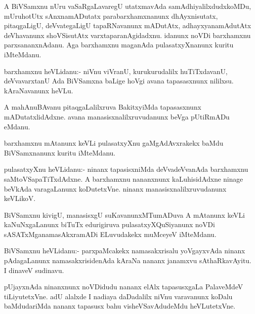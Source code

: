 \documentclass{article}
\begin{document}
\begin{mn}
A BiVSamxnu nUru vaSaRgaLavaregU utatxmavAda samAdhiyalilxdudxkoMDu,
mUruhotUtx sAnxnamADutatx parabarxhamxnanunx dhAyxnisutatx,
pitaqgaLigU, deVvategaLigU tapaRNavanunx mADutAtx, adhayxyanamAdutAtx
deVhavanunx shoVSisutAtx varxtaparanAgidadxnu. idanunx noVDi
barxhamxnu parxsananxnAdanu. Aga barxhamxnu maganAda pulasatxyXnanunx
kuritu iMteMdanu.
\end{mn}

\begin{mn}
barxhamxnu heVLidanu:- niVnu viVranU, kurukurudalilx huTiTxdavanU,
deVvavarxtanU Ada BiVSamxna baLige hoVgi avana tapasasxnunx
nililxsu. kAraNavanunx heVLu.
\end{mn}

\begin{mn}
A mahAnuBAvanu pitaqgaLalilxruva BakitxyiMda tapasasxnunx
mADutatxlidAdxne. avana manasisxnalilxruvudanunx beVga pUtiRmADu eMdanu.
\end{mn}

\begin{mn}
barxhamxnu mAtanunx keVLi pulasatxyXnu gaMgAdAvxrakekx baMdu
BiVSamxnanunx kuritu iMteMdanu.
\end{mn}

\begin{mn}%
pulasatxyXnu heVLidanu:- ninanx tapasisxniMda deVvadeVvanAda
barxhamxnu saMtoVSapaTiTxdAdxne. A barxhamxnu nananxnunx
kaLuhisidAdxne ninage beVkAda varagaLanunx koDutetxVne. ninanx
manasisxnalilxruvudanunx keVLikoV.
\end{mn}

\begin{mn}
BiVSamxnu kivigU, manasisxgU suKavanunxMTumADuva A mAtanunx keVLi
kaNuNxgaLanunx biTuTx edurigiruva pulasatxyXQuSiyanunx noVDi
sASATxMganamasAkxramADi ELuvudakekx muMceyeV iMteMdanu.
\end{mn}

\begin{mn}
BiVSamxnu heVLidanu:- parxpaMcakekx namasakxrisalu yoVgayxvAda ninanx
pAdagaLanunx namasakxrisidenAda kAraNa nananx janamxvu
sAthaRkavAyitu. I dinaveV sudinavu.
\end{mn}

\begin{mn}
pUjayxnAda ninanxnunx noVDidudu nananx elAlx tapasusxgaLa PalaveMdeV
tiLiyutetxVne. adU alalxde I nadiaya daDadalilx niVnu varavanunx
koDalu baMdudariMda nananx tapasusx bahu visheVSavAdudeMdu heVLutetxVne.
\end{mn}
\end{document}
